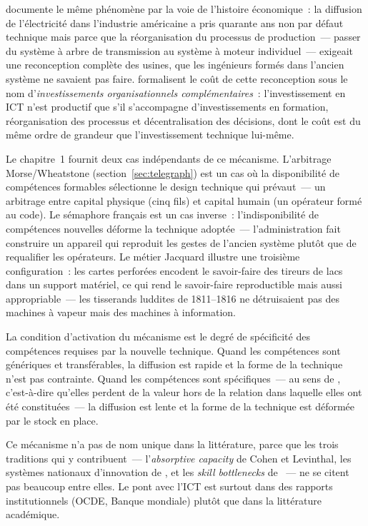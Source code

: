 \textcite{david_dynamo_1990} documente le même phénomène par la voie de l'histoire économique~: la diffusion de l'électricité dans l'industrie américaine a pris quarante ans non par défaut technique mais parce que la réorganisation du processus de production~--- passer du système à arbre de transmission au système à moteur individuel~--- exigeait une reconception complète des usines, que les ingénieurs formés dans l'ancien système ne savaient pas faire. \textcite{bresnahan_information_2002} formalisent le coût de cette reconception sous le nom d'\emph{investissements organisationnels complémentaires}~: l'investissement en ICT n'est productif que s'il s'accompagne d'investissements en formation, réorganisation des processus et décentralisation des décisions, dont le coût est du même ordre de grandeur que l'investissement technique lui-même.

Le chapitre~1 fournit deux cas indépendants de ce mécanisme. L'arbitrage Morse/Wheatstone (section~\ref{sec:telegraph}) est un cas où la disponibilité de compétences formables sélectionne le design technique qui prévaut~--- un arbitrage entre capital physique (cinq fils) et capital humain (un opérateur formé au code). Le sémaphore français est un cas inverse~: l'indisponibilité de compétences nouvelles déforme la technique adoptée~--- l'administration fait construire un appareil qui reproduit les gestes de l'ancien système plutôt que de requalifier les opérateurs. Le métier Jacquard illustre une troisième configuration~: les cartes perforées encodent le savoir-faire des tireurs de lacs dans un support matériel, ce qui rend le savoir-faire reproductible mais aussi appropriable~--- les tisserands luddites de 1811--1816 ne détruisaient pas des machines à vapeur mais des machines à information.

La condition d'activation du mécanisme est le degré de spécificité des compétences requises par la nouvelle technique. Quand les compétences sont génériques et transférables, la diffusion est rapide et la forme de la technique n'est pas contrainte. Quand les compétences sont spécifiques~--- au sens de \textcite{williamson_economic_1985}, c'est-à-dire qu'elles perdent de la valeur hors de la relation dans laquelle elles ont été constituées~--- la diffusion est lente et la forme de la technique est déformée par le stock en place.

Ce mécanisme n'a pas de nom unique dans la littérature, parce que les trois traditions qui y contribuent~--- l'\emph{absorptive capacity} de Cohen et Levinthal, les systèmes nationaux d'innovation de \textcite{lundvall_national_1992}, et les \emph{skill bottlenecks} de \textcite{rosenberg_technology_1972}~--- ne se citent pas beaucoup entre elles. Le pont avec l'ICT est surtout dans des rapports institutionnels (OCDE, Banque mondiale) plutôt que dans la littérature académique.


